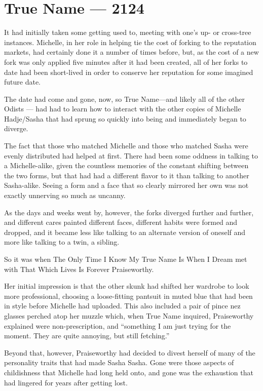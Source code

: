 \hypertarget{true-name-2124}{%
\chapter{True Name — 2124}\label{true-name-2124}}

It had initially taken some getting used to, meeting with one's up- or cross-tree instances. Michelle, in her role in helping tie the cost of forking to the reputation markets, had certainly done it a number of times before, but, as the cost of a new fork was only applied five minutes after it had been created, all of her forks to date had been short-lived in order to conserve her reputation for some imagined future date.

The date had come and gone, now, so True Name---and likely all of the other Odists — had had to learn how to interact with the other copies of Michelle Hadje/Sasha that had sprung so quickly into being and immediately began to diverge.

The fact that those who matched Michelle and those who matched Sasha were evenly distributed had helped at first. There had been some oddness in talking to a Michelle-alike, given the countless memories of the constant shifting between the two forms, but that had had a different flavor to it than talking to another Sasha-alike. Seeing a form and a face that so clearly mirrored her own was not exactly unnerving so much as uncanny.

As the days and weeks went by, however, the forks diverged further and further, and different cares painted different faces, different habits were formed and dropped, and it became less like talking to an alternate version of oneself and more like talking to a twin, a sibling.

So it was when The Only Time I Know My True Name Is When I Dream met with That Which Lives Is Forever Praiseworthy.

Her initial impression is that the other skunk had shifted her wardrobe to look more professional, choosing a loose-fitting pantsuit in muted blue that had been in style before Michelle had uploaded. This also included a pair of pince nez glasses perched atop her muzzle which, when True Name inquired, Praiseworthy explained were non-prescription, and ``something I am just trying for the moment. They are quite annoying, but still fetching.''

Beyond that, however, Praiseworthy had decided to divest herself of many of the personality traits that had made Sasha Sasha. Gone were those aspects of childishness that Michelle had long held onto, and gone was the exhaustion that had lingered for years after getting lost.

